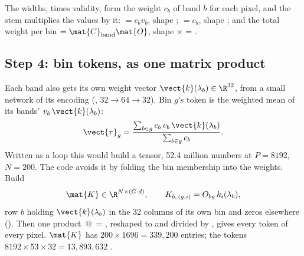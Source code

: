 The widths, times validity, form the weight $c_b$ of band $b$ for each pixel, and the stem multiplies the values by it:
 $=c_b v_b$, shape ;  $=c_b$, shape ; and the total weight per
bin  $=\mat{C}_{\text{band}}\mat{O}$, shape $\times$ = .

\subsection{Step 4: bin tokens, as one matrix product}

Each band also gets its own weight vector $\vect{k}(\lambda_b)\in\R^{32}$, from a small network of its encoding
(, $32\to64\to32$). Bin $g$'s token is the weighted mean of its bands' $v_b\,\vect{k}(\lambda_b)$:
\begin{equation}
\vect{\tau}_g=\frac{\sum_{b\in g}c_b\,v_b\,\vect{k}(\lambda_b)}{\sum_{b\in g}c_b}.
\label{eq:namer:token}
\end{equation}
Written as a loop this would build a  tensor, 52.4 million numbers at $P=8192$, $N=200$. The code
avoids it by folding the bin membership into the weights. Build
\begin{equation}
\mat{K}\in\R^{N\times(G\cdot d)},\qquad K_{b,\,(g,i)}=O_{bg}\,k_i(\lambda_b),
\end{equation}
row $b$ holding $\vect{k}(\lambda_b)$ in the 32 columns of its own bin and zeros elsewhere
(). Then one product
\,@\, = , reshaped to  and divided by
, gives every token of every pixel. $\mat{K}$ has $200\times1696=339{,}200$ entries; the tokens
$8192\times53\times32=13{,}893{,}632$ \tagC.

